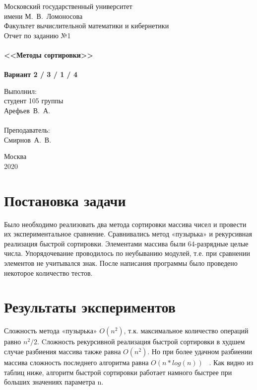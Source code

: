 \documentclass[a4paper,12pt,titlepage,finall]{article}
\begin{document}
\begin{titlepage}
    \begin{center}
	{\small \sc Московский государственный университет \\имени М.~В.~Ломоносова\\
	Факультет вычислительной математики и кибернетики\\}
	\vfill
	{\Large \sc Отчет по заданию №1}\\
	~\\
	{\large \bf <<Методы сортировки>>}\\ 
	~\\
	{\large \bf Вариант 2 / 3 / 1 / 4}
    \end{center}
    \begin{flushright}
	\vfill {Выполнил:\\
	студент 105 группы\\
	Арефьев~В.~А.\\
	~\\
	Преподаватель:\\
	Смирнов~А.~В.}
    \end{flushright}
    \begin{center}
	\vfill
	{\small Москва\\2020}
    \end{center}
\end{titlepage}

\tableofcontents
\newpage

\section{Постановка задачи}

Было необходимо реализовать два метода сортировки массива чисел и провести их экспериментальное сравнение. Сравнивались метод «пузырька» и рекурсивная реализация быстрой сортировки. Элементами массива были 64-разрядные целые числа. Упорядочевание проводилось  по неубыванию модулей, т.е. при сравнении элементов не учитывался знак. После написания программы было проведено некоторое количество тестов.

\newpage

\section{Результаты экспериментов}

Сложность метода «пузырька»  $O(n^2)$, т.к. максимальное количество операций равно $n^2/2$. Cложность рекурсивной реализация быстрой сортировки в худшем случае разбиения массива также равна  $O(n^2)$. Но при более удачном разбиении массива сложность последнего алгоритма равна  $O(n*log(n))$ ~\cite{cs}.
Как видно из таблиц ниже, алгоритм быстрой сортировки работает намного быстрее при больших значениях параметра n.
\end{document}
